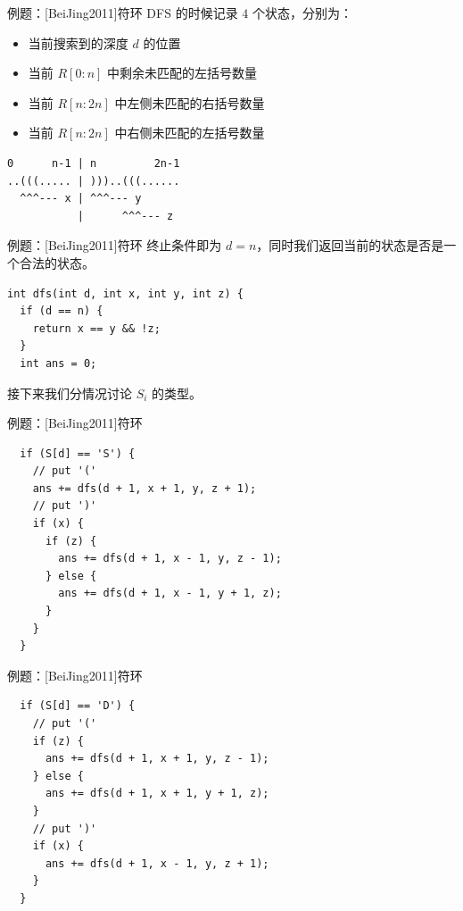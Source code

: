 \documentclass[12pt,aspectratio=169]{beamer}
\begin{document}
\begin{frame}[fragile]{例题：[BeiJing2011]符环}
  DFS 的时候记录 $4$ 个状态，分别为：

  \begin{itemize}
    \item 当前搜索到的深度 $d$ 的位置
    \item 当前 $R[0:n]$ 中剩余未匹配的左括号数量
    \item 当前 $R[n:2n]$ 中左侧未匹配的右括号数量
    \item 当前 $R[n:2n]$ 中右侧未匹配的左括号数量
  \end{itemize}

  \begin{verbatim}
0      n-1 | n         2n-1
..(((..... | )))..(((......
  ^^^--- x | ^^^--- y
           |      ^^^--- z
  \end{verbatim}
\end{frame}

\begin{frame}[fragile]{例题：[BeiJing2011]符环}
  终止条件即为 $d = n$，同时我们返回当前的状态是否是一个合法的状态。

  \begin{verbatim}
int dfs(int d, int x, int y, int z) {
  if (d == n) {
    return x == y && !z;
  }
  int ans = 0;
  \end{verbatim}

  接下来我们分情况讨论 $S_i$ 的类型。
\end{frame}

\begin{frame}[fragile]{例题：[BeiJing2011]符环}
  \begin{verbatim}
  if (S[d] == 'S') {
    // put '('
    ans += dfs(d + 1, x + 1, y, z + 1);
    // put ')'
    if (x) {
      if (z) {
        ans += dfs(d + 1, x - 1, y, z - 1);
      } else {
        ans += dfs(d + 1, x - 1, y + 1, z);
      }
    }
  }
  \end{verbatim}
\end{frame}

\begin{frame}[fragile]{例题：[BeiJing2011]符环}
  \begin{verbatim}
  if (S[d] == 'D') {
    // put '('
    if (z) {
      ans += dfs(d + 1, x + 1, y, z - 1);
    } else {
      ans += dfs(d + 1, x + 1, y + 1, z);
    }
    // put ')'
    if (x) {
      ans += dfs(d + 1, x - 1, y, z + 1);
    }
  }
  \end{verbatim}
\end{frame}
\end{document}
